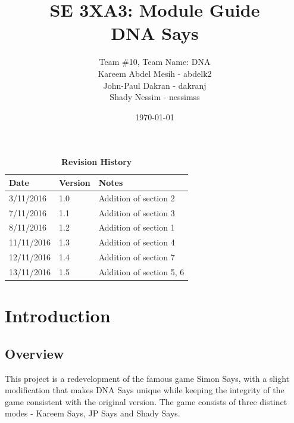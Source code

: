 \documentclass[12pt, titlepage]{article}
\title{SE 3XA3: Module Guide\\DNA Says}
\author{Team \#10, Team Name: DNA
		\\ Kareem Abdel Mesih - abdelk2
		\\ John-Paul Dakran - dakranj
		\\ Shady Nessim - nessimss
}
\date{\today}
\begin{document}
\maketitle

\tableofcontents
\listoftables
\listoffigures

\begin{table}[H]
\caption{\bf Revision History}
\begin{tabularx}{\textwidth}{p{3cm}p{2cm}X}
\toprule {\bf Date} & {\bf Version} & {\bf Notes}\\
\midrule
3/11/2016 & 1.0 & Addition of section 2\\
7/11/2016 & 1.1 & Addition of section 3\\
8/11/2016 & 1.2 & Addition of section 1\\
11/11/2016 & 1.3 & Addition of section 4\\
12/11/2016 & 1.4 & Addition of section 7\\
13/11/2016 & 1.5 & Addition of section 5, 6\\
\bottomrule
\end{tabularx}
\end{table}

\newpage


\section{Introduction}

\subsection{Overview}
\par This project is a redevelopment of the famous game Simon Says, with a slight modification that makes DNA Says unique while keeping the integrity of the game consistent with the original version. The game consists of three distinct modes - Kareem Says, JP Says and Shady Says.
\end{document}
